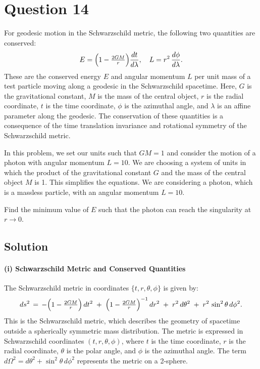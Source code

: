 \section*{Question 14}
For geodesic motion in the Schwarzschild metric, the following two quantities are conserved:
\[
E = \Bigl(1 - \tfrac{2GM}{r}\Bigr) \frac{dt}{d\lambda},
\quad
L = r^{2}\,\frac{d\phi}{d\lambda}.
\]
These are the conserved energy \(E\) and angular momentum \(L\) per unit mass of a test particle moving along a geodesic in the Schwarzschild spacetime. Here, \(G\) is the gravitational constant, \(M\) is the mass of the central object, \(r\) is the radial coordinate, \(t\) is the time coordinate, \(\phi\) is the azimuthal angle, and \(\lambda\) is an affine parameter along the geodesic. The conservation of these quantities is a consequence of the time translation invariance and rotational symmetry of the Schwarzschild metric.

In this problem, we set our units such that \(GM = 1\) and consider the motion of a photon with angular momentum \(L = 10\). We are choosing a system of units in which the product of the gravitational constant \(G\) and the mass of the central object \(M\) is 1. This simplifies the equations. We are considering a photon, which is a massless particle, with an angular momentum \(L=10\).

Find the minimum value of \(E\) such that the photon can reach the singularity at \(r \to 0\).

\subsection*{Solution}

\paragraph{(i) Schwarzschild Metric and Conserved Quantities}
The Schwarzschild metric in coordinates \(\{t, r, \theta, \phi\}\) is given by:
\[
ds^2
\,=\, -\Bigl(1 - \tfrac{2GM}{r}\Bigr)\,dt^2
\;+\; \Bigl(1 - \tfrac{2GM}{r}\Bigr)^{-1}\,dr^2
\;+\; r^2\,d\theta^2
\;+\; r^2\,\sin^2\theta\,d\phi^2.
\]
This is the Schwarzschild metric, which describes the geometry of spacetime outside a spherically symmetric mass distribution. The metric is expressed in Schwarzschild coordinates \((t, r, \theta, \phi)\), where \(t\) is the time coordinate, \(r\) is the radial coordinate, \(\theta\) is the polar angle, and \(\phi\) is the azimuthal angle. The term \(d\Omega^2 = d\theta^2 + \sin^2\theta\,d\phi^2\) represents the metric on a 2-sphere.

